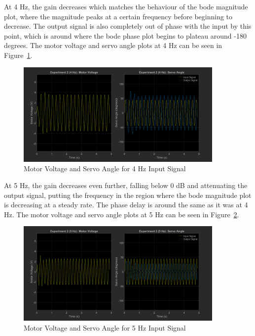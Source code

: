 \documentclass[12pt]{article}
\begin{document}
At 4 Hz, the gain decreases which matches the behaviour of the bode magnitude plot, where the magnitude peaks at a certain frequency before beginning to decrease. The output signal is also completely out of phase with the input by this point, which is around where the bode phase plot begins to plateau around -180 degrees. The motor voltage and servo angle plots at 4 Hz can be seen in Figure~\ref{fig:exp2_4}.
\begin{figure}[h!]
    \centering
    \includegraphics[width=0.9\textwidth]{exp2_4}
    \caption{\label{fig:exp2_4}Motor Voltage and Servo Angle for 4 Hz Input Signal}
\end{figure}

At 5 Hz, the gain decreases even further, falling below 0 dB and attenuating the output signal, putting the frequency in the region where the bode magnitude plot is decreasing at a steady rate. The phase delay is around the same as it was at 4 Hz. The motor voltage and servo angle plots at 5 Hz can be seen in Figure~\ref{fig:exp2_5}.
\begin{figure}[h!]
    \centering
    \includegraphics[width=0.9\textwidth]{exp2_5}
    \caption{\label{fig:exp2_5}Motor Voltage and Servo Angle for 5 Hz Input Signal}
\end{figure}
\end{document}
